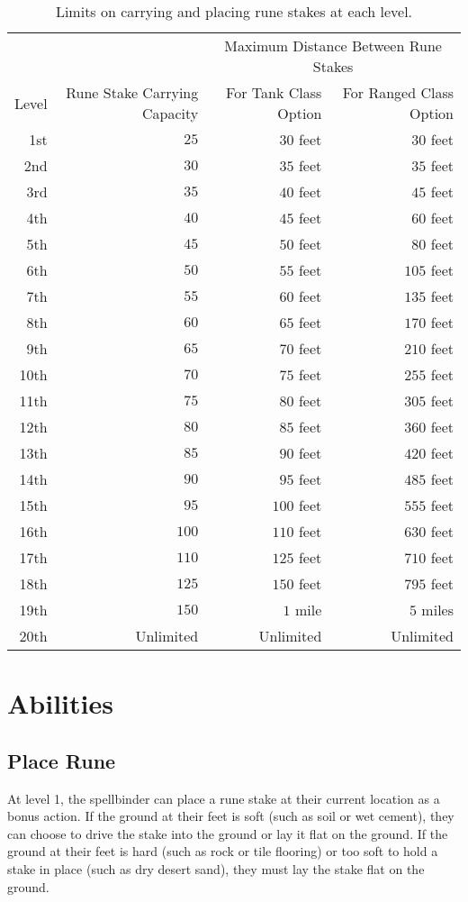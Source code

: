 \begin{table}
\center
\begin{tabular}{r | r | r r }
\toprule
\multicolumn{2}{c}{} & \multicolumn{2}{c}{Maximum Distance Between Rune Stakes} \\
Level & Rune Stake Carrying Capacity & For Tank Class Option & For Ranged Class Option \\
\midrule
1st  & $25$ & $30$ feet & $30$ feet \\
2nd  & $30$ & $35$ feet & $35$ feet \\
3rd  & $35$ & $40$ feet & $45$ feet \\
4th  & $40$ & $45$ feet & $60$ feet \\
5th  & $45$ & $50$ feet & $80$ feet \\
6th  & $50$ & $55$ feet & $105$ feet \\
7th  & $55$ & $60$ feet & $135$ feet \\
8th  & $60$ & $65$ feet & $170$ feet \\
9th  & $65$ & $70$ feet & $210$ feet \\
10th & $70$ & $75$ feet & $255$ feet \\
11th & $75$ & $80$ feet & $305$ feet \\
12th & $80$ & $85$ feet & $360$ feet \\
13th & $85$ & $90$ feet & $420$ feet \\
14th & $90$ & $95$ feet & $485$ feet \\
15th & $95$ & $100$ feet & $555$ feet \\
16th & $100$ & $110$ feet & $630$ feet \\
17th & $110$ & $125$ feet & $710$ feet \\
18th & $125$ & $150$ feet & $795$ feet \\
19th & $150$ & $1$ mile & $5$ miles \\
20th & Unlimited & Unlimited & Unlimited \\
\bottomrule
\end{tabular}
\label{table:class-spellbinding-limits}
\caption{Limits on carrying and placing rune stakes at each level.}
\end{table}


\section{Abilities}
\subsection{Place Rune}
At level 1, the spellbinder can place a rune stake at their current location as a bonus action. If the ground at their feet is soft (such as soil or wet cement), they can choose to drive the stake into the ground or lay it flat on the ground. If the ground at their feet is hard (such as rock or tile flooring) or too soft to hold a stake in place (such as dry desert sand), they must lay the stake flat on the ground.

